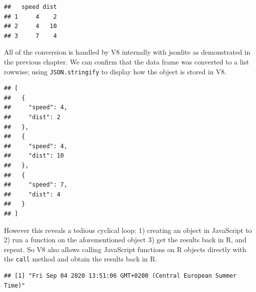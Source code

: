 \documentclass[
]{krantz}
\makeatletter
\newenvironment{Shaded}{\begin{snugshade}}{\end{snugshade}}
\newcommand{\CommentTok}[1]{\textcolor[rgb]{0.37,0.37,0.37}{\textit{#1}}}
\newcommand{\KeywordTok}[1]{\textcolor[rgb]{0.27,0.27,0.27}{\textbf{#1}}}
\newcommand{\NormalTok}[1]{#1}
\newcommand{\OperatorTok}[1]{\textcolor[rgb]{0.43,0.43,0.43}{\textbf{#1}}}
\newcommand{\StringTok}[1]{\textcolor[rgb]{0.5,0.5,0.5}{#1}}
\newenvironment{kframe}{%
\medskip{}
\setlength{\fboxsep}{.8em}
 \def\at@end@of@kframe{}%
 \ifinner\ifhmode%
  \def\at@end@of@kframe{\end{minipage}}%
  \begin{minipage}{\columnwidth}%
 \fi\fi%
 \def\FrameCommand##1{\hskip\@totalleftmargin \hskip-\fboxsep
 \colorbox{shadecolor}{##1}\hskip-\fboxsep
     \hskip-\linewidth \hskip-\@totalleftmargin \hskip\columnwidth}%
 \MakeFramed {\advance\hsize-\width
   \@totalleftmargin\z@ \linewidth\hsize
   \@setminipage}}%
 {\par\unskip\endMakeFramed%
 \at@end@of@kframe}
\renewenvironment{Shaded}{\begin{kframe}}{\end{kframe}}
\makeatother
\begin{document}
\begin{verbatim}
##   speed dist
## 1     4    2
## 2     4   10
## 3     7    4
\end{verbatim}

All of the conversion is handled by V8 internally with jsonlite as demonstrated in the previous chapter. We can confirm that the data frame was converted to a list rowwise; using \texttt{JSON.stringify} to display how the object is stored in V8.

\begin{Shaded}
\end{Shaded}

\begin{verbatim}
## [
##   {
##     "speed": 4,
##     "dist": 2
##   },
##   {
##     "speed": 4,
##     "dist": 10
##   },
##   {
##     "speed": 7,
##     "dist": 4
##   }
## ]
\end{verbatim}

However this reveals a tedious cyclical loop: 1) creating an object in JavaScript to 2) run a function on the aforementioned object 3) get the results back in R, and repeat. So V8 also allows calling JavaScript functions on R objects directly with the \texttt{call} method and obtain the results back in R.

\begin{Shaded}
\end{Shaded}

\begin{verbatim}
## [1] "Fri Sep 04 2020 13:51:06 GMT+0200 (Central European Summer Time)"
\end{verbatim}

\begin{Shaded}
\end{Shaded}
\end{document}
